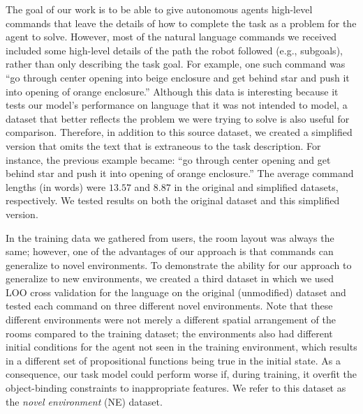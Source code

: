 \documentclass[conference]{IEEEtran}
\begin{document}
The goal of our work is to be able to give autonomous agents high-level commands that leave the details of how to complete the task as a problem for the agent to solve. However, most of the natural language commands we received included some high-level details of the path the robot followed (e.g., subgoals), rather than only describing the task goal. 
For example, one such command was ``go through center opening into beige enclosure and get behind star and push it into opening of orange enclosure.'' 
Although this data is interesting because it tests our model's performance on language that it was not intended to model, a dataset that better reflects the problem we were trying to solve is also useful for comparison. Therefore, in addition to this source dataset, we  created a simplified version that omits the text that is extraneous to the task description. 
For instance, the previous example became: ``go through center opening and get behind star and push it into opening of orange enclosure.'' 
The average command lengths (in words) were $13.57$ and $8.87$ in the original and simplified datasets, respectively. We tested results on both the original dataset and this simplified version.

In the training data we gathered from users, the room layout was always the same; however, one of the advantages of our approach is that commands can generalize to novel environments. To demonstrate the ability for our approach to generalize to new environments, we created a third dataset in which we used LOO cross validation for the language on the original (unmodified) dataset and tested each command on three different novel environments. Note that these different environments were not merely a different spatial arrangement of the rooms compared to the training dataset; the environments also had different initial conditions for the agent not seen in the training environment, which results in a different set of propositional functions being true in the initial state. As a consequence, our task model could perform worse if, during training, it overfit the object-binding constraints to inappropriate features. We refer to this dataset as the {\em novel environment} (NE) dataset.


\end{document}
